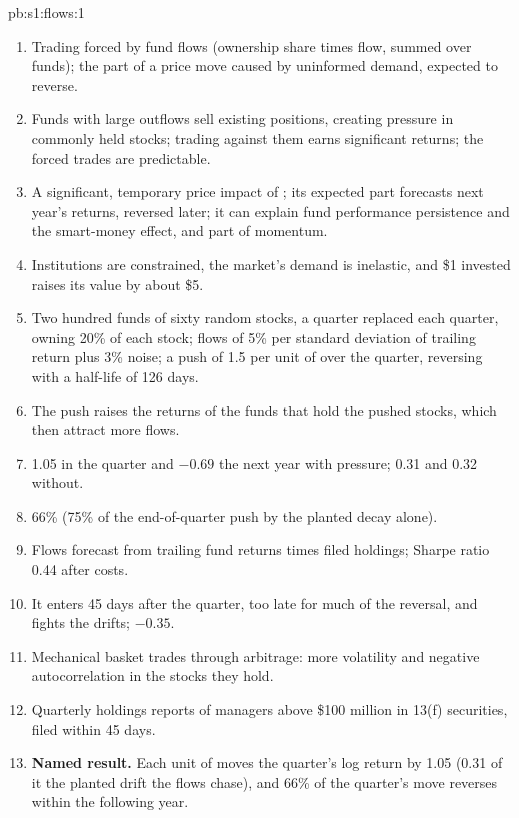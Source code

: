 \begin{solution}{pb:s1:flows:1}
\begin{enumerate}
\item Trading forced by fund flows (ownership share times flow, summed over funds); the part of a price move caused by uninformed demand, expected to reverse.
\item Funds with large outflows sell existing positions, creating pressure in commonly held stocks; trading against them earns significant returns; the
forced trades are predictable.
\item A significant, temporary price impact of ; its expected part forecasts next year's returns, reversed later; it can explain fund
performance persistence and the smart-money effect, and part of momentum.
\item Institutions are constrained, the market's demand is inelastic, and \$1 invested raises its value by about \$5.
\item Two hundred funds of sixty random stocks, a quarter replaced each quarter, owning 20\% of each stock; flows of 5\% per standard deviation of trailing
return plus 3\% noise; a push of 1.5 per unit of  over the quarter, reversing with a half-life of 126 days.
\item The push raises the returns of the funds that hold the pushed stocks, which then attract more flows.
\item 1.05 in the quarter and $-0.69$ the next year with pressure; 0.31 and 0.32 without.
\item 66\% (75\% of the end-of-quarter push by the planted decay alone).
\item Flows forecast from trailing fund returns times filed holdings; Sharpe ratio 0.44 after costs.
\item It enters 45 days after the quarter, too late for much of the reversal, and fights the drifts; $-0.35$.
\item Mechanical basket trades through arbitrage: more volatility and negative autocorrelation in the stocks they hold.
\item Quarterly holdings reports of managers above \$100 million in 13(f) securities, filed within 45 days.
\item \textbf{Named result.} Each unit of  moves the quarter's log return by 1.05 (0.31 of it the planted drift the flows chase), and 66\%
of the quarter's move reverses within the following year.

\end{enumerate}
\end{solution}

